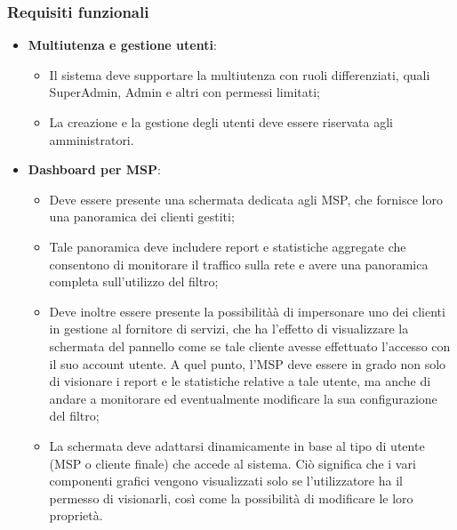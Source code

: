 \subsubsection{Requisiti funzionali}
\begin{itemize}
  \item \textbf{Multiutenza e gestione utenti}:
    \begin{itemize}
      \item Il sistema deve supportare la multiutenza con ruoli differenziati, quali SuperAdmin, Admin e altri con permessi limitati;
      \item La creazione e la gestione degli utenti deve essere riservata agli amministratori.
    \end{itemize}

  \item \textbf{Dashboard per MSP}:
    \begin{itemize}
      \item Deve essere presente una schermata dedicata agli MSP, che fornisce loro una panoramica dei clienti gestiti;
      \item Tale panoramica deve includere report e statistiche aggregate che consentono di monitorare il traffico sulla rete e avere una panoramica completa sull'utilizzo del filtro;
      \item Deve inoltre essere presente la possibilitàà di impersonare uno dei clienti in gestione al fornitore di servizi, che ha l'effetto di visualizzare la schermata del pannello come se tale cliente avesse effettuato l'accesso con il suo account utente. A quel punto, l'MSP deve essere in grado non solo di visionare i report e le statistiche relative a tale utente, ma anche di andare a monitorare ed eventualmente modificare la sua configurazione del filtro;
      \item La schermata deve adattarsi dinamicamente in base al tipo di utente (MSP o cliente finale) che accede al sistema. Ciò significa che i vari componenti grafici vengono visualizzati solo se l'utilizzatore ha il permesso di visionarli, così come la possibilità di modificare le loro proprietà.
    \end{itemize}


\end{itemize}
